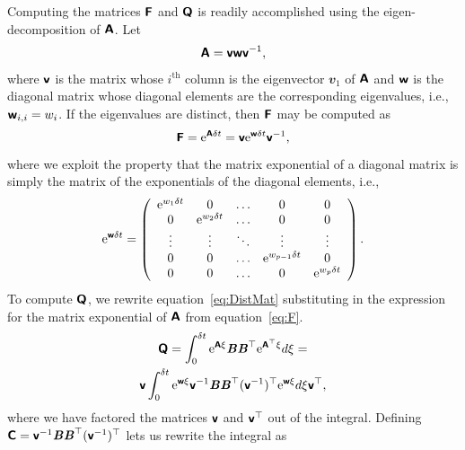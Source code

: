 \documentclass[a4paper,fleqn,usenatbib]{mnras}
\begin{document}
Computing the matrices $\textbf{\textsf{F}}$ and $\textbf{\textsf{Q}}$ is readily accomplished using the eigen-decomposition of $\textbf{\textsf{A}}$. Let
\begin{equation}
\textbf{\textsf{A}} = \textbf{\textsf{v}}\textbf{\textsf{w}}\textbf{\textsf{v}}^{-1},
\end{equation}
where $\textbf{\textsf{v}}$ is the matrix whose $i^{\mathrm{th}}$ column is the eigenvector $\mathbfit{v}_{1}$ of $\textbf{\textsf{A}}$ and $\textbf{\textsf{w}}$ is the diagonal matrix whose diagonal elements are the corresponding eigenvalues, i.e., $\textbf{\textsf{w}}_{i,i} = w_{i}$. If the eigenvalues are distinct, then $\textbf{\textsf{F}}$ may be computed as
\begin{equation}\label{eq:F}
\textbf{\textsf{F}} = \mathrm{e}^{\textbf{\textsf{A}}\delta t} = \textbf{\textsf{v}}\mathrm{e}^{\textbf{\textsf{w}}\delta t}\textbf{\textsf{v}}^{-1},
\end{equation}
where we exploit the property that the matrix exponential of a diagonal matrix is simply the matrix of the exponentials of the diagonal elements, i.e.,
\begin{equation}\label{eq:MatrixExp}
\mathrm{e}^{\textbf{\textsf{w}}\delta t} = \left( \begin{array}{ccccc} 
\mathrm{e}^{w_{1} \delta t} & 0 & \hdots & 0 & 0 \\
0 & \mathrm{e}^{w_{2} \delta t} & \hdots & 0 & 0 \\
\vdots & \vdots & \ddots & \vdots & \vdots \\
0 & 0 & \hdots & \mathrm{e}^{w_{p-1} \delta t} & 0 \\
0 & 0 & \hdots & 0 & \mathrm{e}^{w_{p} \delta t} \\
\end{array}\right).
\end{equation}
To compute $\textbf{\textsf{Q}}$, we rewrite equation~\ref{eq:DistMat} substituting in the expression for the matrix exponential of $\textbf{\textsf{A}}$ from equation~\ref{eq:F}.
\begin{multline}\label{eq:DistMat2}
\textbf{\textsf{Q}} = \int_{0}^{\delta t} \mathrm{e}^{\textbf{\textsf{A}}\xi}\textbf{\textit{B}}\textbf{\textit{B}}^{\top}\mathrm{e}^{\textbf{\textsf{A}}^{\top}\xi} d\xi = \\ \textbf{\textsf{v}} \int_{0}^{\delta t} \mathrm{e}^{\textbf{\textsf{w}}\xi}\textbf{\textsf{v}}^{-1}\textbf{\textit{B}}\textbf{\textit{B}}^{\top}(\textbf{\textsf{v}}^{-1})^{\top} \mathrm{e}^{\textbf{\textsf{w}}\xi} d\xi \textbf{\textsf{v}}^{\top},
\end{multline}
where we have factored the matrices $\textbf{\textsf{v}}$ and $\textbf{\textsf{v}}^{\top}$ out of the integral. Defining $\textbf{\textsf{C}} = \textbf{\textsf{v}}^{-1}\textbf{\textit{B}}\textbf{\textit{B}}^{\top}(\textbf{\textsf{v}}^{-1})^{\top}$ lets us rewrite the integral as
\end{document}
